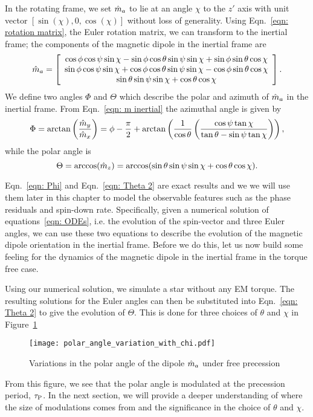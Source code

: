 \documentclass[../full_thesis/full_thesis.tex]{subfiles}
\begin{document}
In the rotating frame, we set $\hat{m}_a$ to lie at an angle $\chi$ to the $z'$ axis
with unit vector $[\sin(\chi), 0, \cos(\chi)]$ without loss of generality.
Using Eqn.~\eqref{eqn: rotation matrix}, the Euler
rotation matrix, we can transform to the inertial frame; the components of the
magnetic dipole in the inertial frame are
\begin{equation}
\hat{m}_a =
\left[\begin{array}{c}
\cos\phi\cos\psi\sin\chi - \sin\phi \cos \theta \sin \psi \sin \chi
+ \sin \phi \sin \theta \cos \chi \\
\sin\phi\cos\psi\sin\chi + \cos\phi \cos \theta \sin \psi \sin \chi
- \cos \phi \sin \theta \cos \chi \\
\sin\theta \sin\psi \sin\chi + \cos\theta \cos \chi
\end{array}\right].
\label{eqn: m inertial}
\end{equation}
We define two angles $\Phi$ and $\Theta$
which describe the polar and azimuth of $\hat{m}_a$ in the inertial frame.
From Eqn.~\eqref{eqn: m inertial} the azimuthal angle is given by
\begin{equation}
    \Phi = \arctan\left(\frac{\hat{m}_{y}}{\hat{m}_{x}}\right) =
\phi - \frac{\pi}{2} + \arctan\left(\frac{1}{\cos\theta}
                       \left(\frac{\cos\psi \tan \chi}{\tan\theta -
                       \sin \psi \tan\chi }\right)\right),
\label{eqn: Phi}
\end{equation}
while the polar angle is
\begin{equation}
\Theta = \arccos(\hat{m}_{z}) = \arccos(\sin \theta \sin \psi \sin \chi + \cos \theta \cos \chi ).
\label{eqn: Theta 2}
\end{equation}

Eqn.~\eqref{eqn: Phi} and Eqn.~\eqref{eqn: Theta 2} are exact results and we
we will use them later in this chapter to model the observable features such
as the phase residuals and spin-down rate.
Specifically, given a numerical solution of equations~\eqref{eqn: ODEs}, i.e.
the evolution of the spin-vector and three Euler angles, we can use these two
equations to describe the evolution of the magnetic dipole orientation in the
inertial frame. Before we do this, let us now build some feeling for the dynamics of
the magnetic dipole in the inertial frame in the torque free case.

Using our numerical solution, we simulate a star without any EM torque. The
resulting solutions for the Euler angles can then be substituted into Eqn.~\eqref{eqn: Theta 2}
to give the evolution of $\Theta$. This is done for three choices of $\theta$
and $\chi$ in Figure~\ref{fig: polar angle variations}
\begin{figure}[htb]
\centering
  \texttt{[image: polar\_angle\_variation\_with\_chi.pdf]}
\caption{Variations in the polar angle of the dipole $\hat{m}_a$ under free precession}
\label{fig: polar angle variations}
\end{figure}
From this figure, we see that the polar angle is modulated at the precession
period, $\tau_{\mathrm{P}}$. In the next section, we will provide a deeper understanding
of where the size of modulations comes from and the significance in the choice
of $\theta$ and $\chi$.
\end{document}
